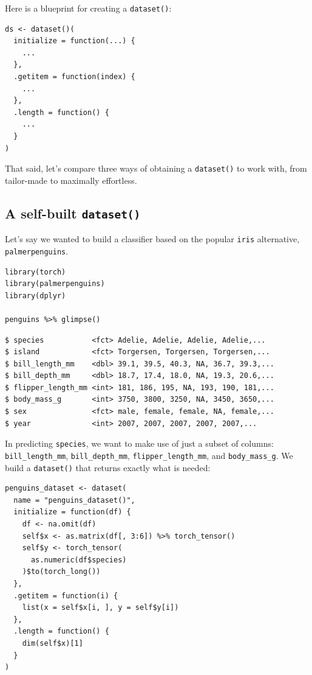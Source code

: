 \documentclass[
  letterpaper,
]{krantz}
\begin{document}
Here is a blueprint for creating a \texttt{dataset()}:

\begin{verbatim}
ds <- dataset()(
  initialize = function(...) {
    ...
  },
  .getitem = function(index) {
    ...
  },
  .length = function() {
    ...
  }
)
\end{verbatim}

That said, let's compare three ways of obtaining a \texttt{dataset()} to
work with, from tailor-made to maximally effortless.

\hypertarget{a-self-built-dataset}{%
\subsection{\texorpdfstring{A self-built
\texttt{dataset()}}{A self-built dataset()}}\label{a-self-built-dataset}}

Let's say we wanted to build a classifier based on the popular
\texttt{iris} alternative, \texttt{palmerpenguins}.

\begin{verbatim}
library(torch)
library(palmerpenguins)
library(dplyr)

penguins %>% glimpse()
\end{verbatim}

\begin{verbatim}
$ species           <fct> Adelie, Adelie, Adelie, Adelie,...
$ island            <fct> Torgersen, Torgersen, Torgersen,...
$ bill_length_mm    <dbl> 39.1, 39.5, 40.3, NA, 36.7, 39.3,...
$ bill_depth_mm     <dbl> 18.7, 17.4, 18.0, NA, 19.3, 20.6,...
$ flipper_length_mm <int> 181, 186, 195, NA, 193, 190, 181,...
$ body_mass_g       <int> 3750, 3800, 3250, NA, 3450, 3650,...
$ sex               <fct> male, female, female, NA, female,...
$ year              <int> 2007, 2007, 2007, 2007, 2007,...
\end{verbatim}

In predicting \texttt{species}, we want to make use of just a subset of
columns: \texttt{bill\_length\_mm}, \texttt{bill\_depth\_mm},
\texttt{flipper\_length\_mm}, and \texttt{body\_mass\_g}. We build a
\texttt{dataset()} that returns exactly what is needed:

\begin{verbatim}
penguins_dataset <- dataset(
  name = "penguins_dataset()",
  initialize = function(df) {
    df <- na.omit(df)
    self$x <- as.matrix(df[, 3:6]) %>% torch_tensor()
    self$y <- torch_tensor(
      as.numeric(df$species)
    )$to(torch_long())
  },
  .getitem = function(i) {
    list(x = self$x[i, ], y = self$y[i])
  },
  .length = function() {
    dim(self$x)[1]
  }
)
\end{verbatim}
\end{document}
